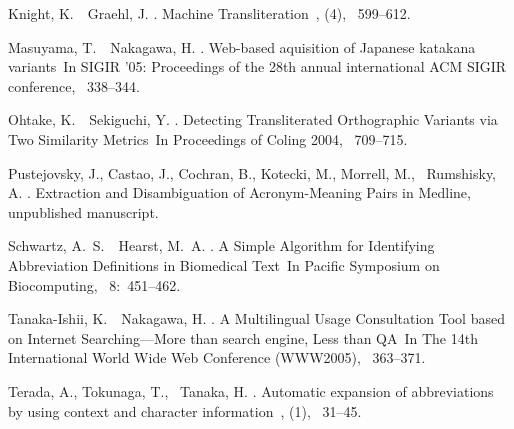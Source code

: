 \documentclass[japanese]{jnlp_1.4}
\begin{document}

\begin{thebibliography}{}

Knight, K.\BBACOMMA\ \BBA\ Graehl, J. \BBCP.
\newblock \BBOQ Machine Transliteration\BBCQ\
, {}  (4), \mbox{\BPGS\
  599--612}.

Masuyama, T.\BBACOMMA\ \BBA\ Nakagawa, H. \BBCP.
\newblock \BBOQ Web-based aquisition of Japanese katakana variants\BBCQ\
\newblock In {\Bem SIGIR '05: Proceedings of the 28th annual international ACM
  SIGIR conference}, \mbox{\BPGS\ 338--344}.

Ohtake, K.\BBACOMMA\ \BBA\ Sekiguchi, Y. \BBOP 2004\BBCP.
\newblock \BBOQ Detecting Transliterated Orthographic Variants via Two
  Similarity Metrics\BBCQ\
\newblock In {\Bem Proceedings of Coling 2004}, \mbox{\BPGS\ 709--715}.

Pustejovsky, J., Castao, J., Cochran, B., Kotecki, M., Morrell, M., \BBA\
  Rumshisky, A. \BBCP.
\newblock \BBOQ Extraction and Disambiguation of Acronym-Meaning Pairs in
  {Medline}, unpublished manuscript\BBCQ.

Schwartz, A.~S.\BBACOMMA\ \BBA\ Hearst, M.~A. \BBCP.
\newblock \BBOQ A Simple Algorithm for Identifying Abbreviation Definitions in
  Biomedical Text\BBCQ\
\newblock In {\Bem Pacific Symposium on Biocomputing}, \mbox{\BPGS\ 8:
  451--462}.

Tanaka-Ishii, K.\BBACOMMA\ \BBA\ Nakagawa, H. \BBCP.
\newblock \BBOQ A Multilingual Usage Consultation Tool based on Internet
  Searching---More than search engine, Less than QA\BBCQ\
\newblock In {\Bem The 14th International World Wide Web Conference (WWW2005)},
  \mbox{\BPGS\ 363--371}.

Terada, A., Tokunaga, T., \BBA\ Tanaka, H. \BBOP 2004\BBCP.
\newblock \BBOQ Automatic expansion of abbreviations by using context and
  character information\BBCQ\
, {}  (1), \mbox{\BPGS\ 31--45}.


\end{thebibliography}
\end{document}
